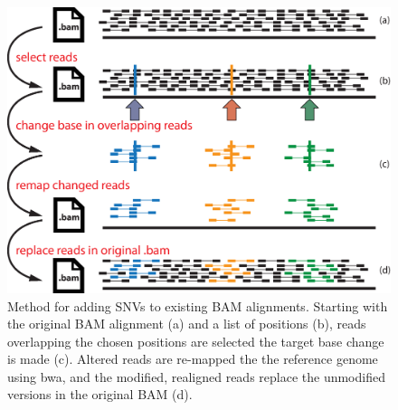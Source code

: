 \documentclass[letterpaper,11pt]{article}
\begin{document}
\newpage %
\begin{figure}[!h]
\centering
\includegraphics[width=5.5in]{bamsurgeon_snv.eps}
\caption{Method for adding SNVs to existing BAM alignments. Starting with the original BAM alignment (a) and a list of positions (b), reads overlapping the chosen positions are selected the target base change is made (c). Altered reads are re-mapped the the reference genome using bwa, and the modified, realigned reads replace the unmodified versions in the original BAM (d).}
\end{figure}

\newpage %
\end{document}
